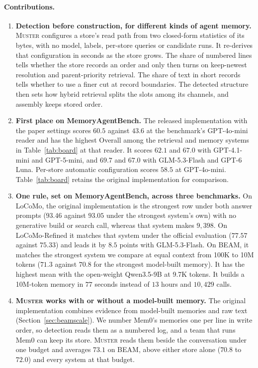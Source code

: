 \documentclass{article}
\newcommand{\sys}{\textsc{Muster}}
\begin{document}
\paragraph{Contributions.}
\begin{enumerate}[label=(\roman*),leftmargin=*,nosep]
\item \textbf{Detection before construction, for different kinds of agent memory.}
\sys{} configures a store's read path from two closed-form statistics of its bytes, with no model, labels, per-store queries or candidate runs. It re-derives that configuration in seconds as the store grows. The share of numbered lines tells whether the store records an order and only then turns on keep-newest resolution and parent-priority retrieval. The share of text in short records tells whether to use a finer cut at record boundaries. The detected structure then sets how hybrid retrieval splits the slots among its channels, and assembly keeps stored order.
\item \textbf{First place on MemoryAgentBench.}
The released implementation with the paper settings scores $60.5$ against $43.6$ at the benchmark's GPT-4o-mini reader and has the highest Overall among the retrieval and memory systems in Table~\ref{tab:board} at that reader. It scores $62.1$ and $67.0$ with GPT-4.1-mini and GPT-5-mini, and $69.7$ and $67.0$ with GLM-5.3-Flash and GPT-6 Luna. Per-store automatic configuration scores $58.5$ at GPT-4o-mini. Table~\ref{tab:board} retains the original implementation for comparison.
\item \textbf{One rule, set on MemoryAgentBench, across three benchmarks.}
On LoCoMo, the original implementation is the strongest row under both answer prompts ($93.46$ against $93.05$ under the strongest system's own) with no generative build or search call, whereas that system makes $9{,}398$. On LoCoMo-Refined it matches that system under the official evaluation ($77.57$ against $75.33$) and leads it by $8.5$ points with GLM-5.3-Flash. On BEAM, it matches the strongest system we compare at equal context from 100K to 10M tokens ($71.3$ against $70.8$ for the strongest model-built memory). It has the highest mean with the open-weight Qwen3.5-9B at 9.7K tokens. It builds a 10M-token memory in $77$ seconds instead of $13$ hours and $10{,}429$ calls.
\item \textbf{\sys{} works with or without a model-built memory.}
The original implementation combines evidence from model-built memories and raw text (Section~\ref{sec:beamscale}). We number Mem0's memories one per line in write order, so detection reads them as a numbered log, and a team that runs Mem0 can keep its store. \sys{} reads them beside the conversation under one budget and averages $73.1$ on BEAM, above either store alone ($70.8$ to $72.0$) and every system at that budget.
\end{enumerate}
\end{document}
